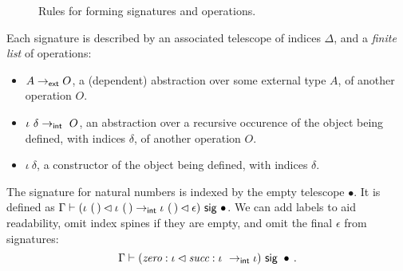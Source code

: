 \enlargethispage{\baselineskip}

\begin{figure}[H]
  \caption{Rules for forming signatures and operations.}
\end{figure}

Each signature is described by an associated telescope of indices $\Delta$, and a
\emph{finite list} of operations:
\begin{itemize}
    \item $A \to_{\textsf{ext}} O$, a (dependent) abstraction over some external type $A$, of another operation $O$.
    \item $\iota\ \delta \to\internal \ O$, an
      abstraction over a recursive occurence of
      the object being defined, with indices $\delta$, of another operation
      $O$.
    \item $\iota\ \delta$, a constructor of the object being defined, with indices $\delta$.
\end{itemize}

\begin{example}\label{ex:nat-sig}
The signature for natural numbers is indexed by the empty telescope $\bullet$.
It is defined as $\Gamma \vdash (\iota\ (\,) \lhd \iota\ (\,) \to_{\textsf{int}}
\iota\ (\,) \lhd \epsilon) \ \textsf{sig}\  \bullet$. We can add labels to aid readability,
omit index spines if they are empty, and omit the final $\epsilon$ from
signatures:
\[
\Gamma \vdash (\textit{zero} : \iota \lhd \textit{succ} : \iota\ \to_{\textsf{int}}
\iota) \ \textsf{sig}\  \bullet \,.
\]
\end{example}

